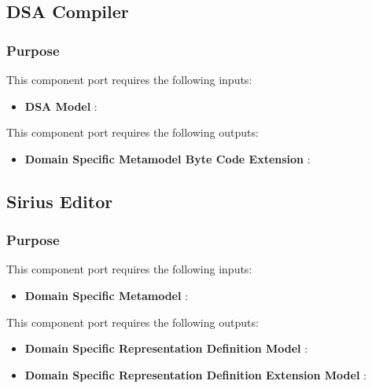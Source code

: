 \documentclass{gemoc} %
\begin{document}
\subsection{DSA Compiler}


\subsubsection{Purpose}

This component port requires the following inputs:
\begin{itemize}
  \item \textbf{DSA Model} :
\end{itemize}

This component port requires the following outputs:
\begin{itemize}
  \item \textbf{Domain Specific Metamodel Byte Code Extension} :
\end{itemize}

\subsection{Sirius Editor}


\subsubsection{Purpose}

This component port requires the following inputs:
\begin{itemize}
  \item \textbf{Domain Specific Metamodel} :
\end{itemize}

This component port requires the following outputs:
\begin{itemize}
  \item \textbf{Domain Specific  Representation Definition Model} :
  \item \textbf{Domain Specific Representation Definition Extension Model} :
\end{itemize}
\end{document}
